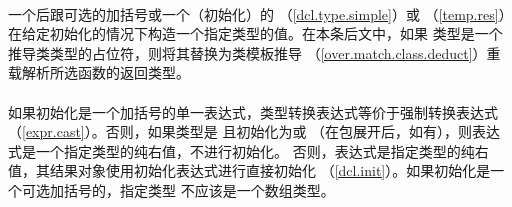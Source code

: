 \paragraph{} %
一个后跟可选的加括号或一个（初始化）的
（\ref{dcl.type.simple}）或
（\ref{temp.res}）在给定初始化的情况下构造一个指定类型的值。在本条后文中，如果
类型是一个推导类类型的占位符，则将其替换为类模板推导
（\ref{over.match.class.deduct}）重载解析所选函数的返回类型。

\paragraph{} %
如果初始化是一个加括号的单一表达式，类型转换表达式等价于强制转换表达式
（\ref{expr.cast}）。否则，如果类型是 且初始化为\tm{()}或
\tm{\{\}}（在包展开后，如有），则表达式是一个指定类型的纯右值，不进行初始化。
否则，表达式是指定类型的纯右值，其结果对象使用初始化表达式进行直接初始化
（\ref{dcl.init}）。如果初始化是一个可选加括号的，指定类型
不应该是一个数组类型。
